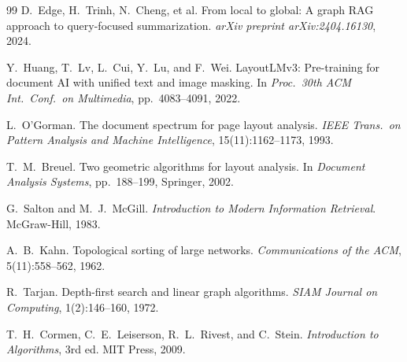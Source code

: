 \documentclass[12pt,a4paper]{report}
\begin{document}
\begin{thebibliography}{99}
D.~Edge, H.~Trinh, N.~Cheng, et al.
From local to global: A graph RAG approach to query-focused summarization.
\textit{arXiv preprint arXiv:2404.16130}, 2024.

Y.~Huang, T.~Lv, L.~Cui, Y.~Lu, and F.~Wei.
LayoutLMv3: Pre-training for document AI with unified text and image masking.
In \textit{Proc.\ 30th ACM Int.\ Conf.\ on Multimedia}, pp.~4083--4091, 2022.

L.~O'Gorman.
The document spectrum for page layout analysis.
\textit{IEEE Trans.\ on Pattern Analysis and Machine Intelligence}, 15(11):1162--1173, 1993.

T.~M.~Breuel.
Two geometric algorithms for layout analysis.
In \textit{Document Analysis Systems}, pp.~188--199, Springer, 2002.

G.~Salton and M.~J.~McGill.
\textit{Introduction to Modern Information Retrieval}.
McGraw-Hill, 1983.

A.~B.~Kahn.
Topological sorting of large networks.
\textit{Communications of the ACM}, 5(11):558--562, 1962.

R.~Tarjan.
Depth-first search and linear graph algorithms.
\textit{SIAM Journal on Computing}, 1(2):146--160, 1972.

T.~H.~Cormen, C.~E.~Leiserson, R.~L.~Rivest, and C.~Stein.
\textit{Introduction to Algorithms}, 3rd ed.
MIT Press, 2009.

\end{thebibliography}
\end{document}
